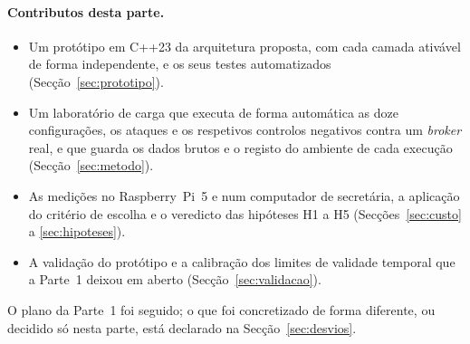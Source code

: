 \paragraph{Contributos desta parte.}
\begin{itemize}[leftmargin=*]
  \item Um protótipo em C++23 da arquitetura proposta, com cada camada ativável de
    forma independente, e os seus testes automatizados (Secção~\ref{sec:prototipo}).
  \item Um laboratório de carga que executa de forma automática as doze
    configurações, os ataques e os respetivos controlos negativos contra um
    \emph{broker} real, e que guarda os dados brutos e o registo do ambiente de cada
    execução (Secção~\ref{sec:metodo}).
  \item As medições no Raspberry~Pi~5 e num computador de secretária, a aplicação
    do critério de escolha e o veredicto das hipóteses H1 a H5
    (Secções~\ref{sec:custo} a \ref{sec:hipoteses}).
  \item A validação do protótipo e a calibração dos limites de validade temporal
    que a Parte~1 deixou em aberto (Secção~\ref{sec:validacao}).
\end{itemize}

O plano da Parte~1 foi seguido; o que foi concretizado de forma diferente, ou
decidido só nesta parte, está declarado na Secção~\ref{sec:desvios}.

